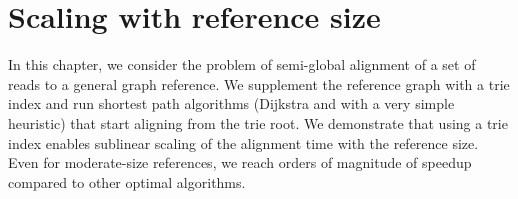 \chapter{Scaling with reference size} \label{ch:trie}
\graphicspath{{\dir/}}

In this chapter, we consider the problem of semi-global alignment of a set of
reads to a general graph reference. We supplement the reference graph with a
trie index and run shortest path algorithms (Dijkstra and \A with a very simple
heuristic) that start aligning from the trie root. We demonstrate that using a
trie index enables sublinear scaling of the alignment time with the reference
size. Even for moderate-size references, we reach orders of magnitude of speedup
compared to other optimal algorithms.






